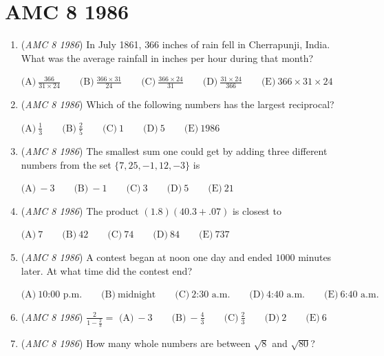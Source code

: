 \section{AMC 8 1986}
        \begin{enumerate}
        	\item (\textit{AMC 8 1986}) In July 1861, $366$ inches of rain fell in Cherrapunji, India.  What was the average rainfall in inches per hour during that month?


 $\text{(A)}\ \frac{366}{31\times 24} \qquad \text{(B)}\ \frac{366\times 31}{24}\qquad \text{(C)}\ \frac{366\times 24}{31}\qquad \text{(D)}\ \frac{31\times 24}{366}\qquad \text{(E)}\  366\times 31\times 24$


	\item (\textit{AMC 8 1986}) Which of the following numbers has the largest reciprocal?


 $\text{(A)}\ \frac{1}{3} \qquad \text{(B)}\ \frac{2}{5} \qquad \text{(C)}\ 1 \qquad \text{(D)}\ 5 \qquad \text{(E)}\ 1986$


	\item (\textit{AMC 8 1986}) The smallest sum one could get by adding three different numbers from the set $\{ 7,25,-1,12,-3 \}$ is


 $\text{(A)}\ -3 \qquad \text{(B)}\ -1 \qquad \text{(C)}\ 3 \qquad \text{(D)}\ 5 \qquad \text{(E)}\ 21$


	\item (\textit{AMC 8 1986}) The product $(1.8)(40.3+.07)$ is closest to 


 $\text{(A)}\ 7 \qquad \text{(B)}\ 42 \qquad \text{(C)}\ 74 \qquad \text{(D)}\ 84 \qquad \text{(E)}\ 737$


	\item (\textit{AMC 8 1986}) A contest began at noon one day and ended $1000$ minutes later.  At what time did the contest end?


 $\text{(A)}\ \text{10:00 p.m.} \qquad \text{(B)}\ \text{midnight} \qquad \text{(C)}\ \text{2:30 a.m.} \qquad \text{(D)}\ \text{4:40 a.m.} \qquad \text{(E)}\ \text{6:40 a.m.}$


	\item (\textit{AMC 8 1986}) $\frac{2}{1-\frac{2}{3}}=$
$\text{(A)}\ -3 \qquad \text{(B)}\ -\frac{4}{3} \qquad \text{(C)}\ \frac{2}{3} \qquad \text{(D)}\ 2 \qquad \text{(E)}\ 6$


	\item (\textit{AMC 8 1986}) How many whole numbers are between $\sqrt{8}$ and $\sqrt{80}$?



\end{enumerate}
